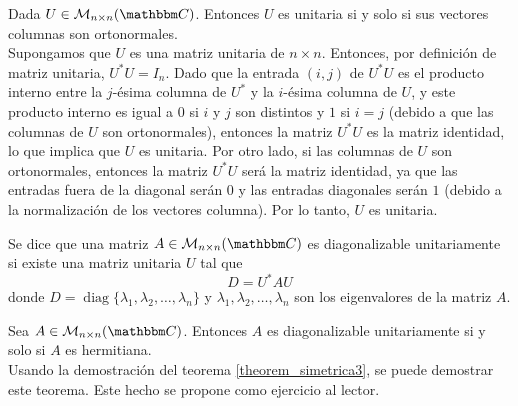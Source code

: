 \begin{theorem}\label{Uorto_vectoresorto}
    Dada $U \in \mathcal{M}_{n \times n}(\CC)$. Entonces $U$ es unitaria si y solo si sus vectores columnas son ortonormales. \\
    \demostracion Supongamos que $U$ es una matriz unitaria de $n \times n$. Entonces, por definición de matriz unitaria, $U^* U = I_n$. Dado que la entrada \( (i, j) \) de $U^*U$ es el producto interno entre la $j$-ésima columna de $U^*$ y la $i$-ésima columna de $U$, y este producto interno es igual a $0$ si $i$ y $j$ son distintos y $1$ si $i = j$ (debido a que las columnas de $U$ son ortonormales), entonces la matriz $U^* U$ es la matriz identidad, lo que implica que $U$ es unitaria. Por otro lado, si las columnas de $U$ son ortonormales, entonces la matriz $U^* U$ será la matriz identidad, ya que las entradas fuera de la diagonal serán $0$ y las entradas diagonales serán $1$ (debido a la normalización de los vectores columna). Por lo tanto, $U$ es unitaria.
\end{theorem}

\begin{definition}
    Se dice que una matriz $A \in \mathcal{M}_{n \times n}(\CC)$ es diagonalizable unitariamente si existe una matriz unitaria $U$ tal que
    $$D = U^*AU$$
    donde $D = \operatorname{diag} \{ \lambda_1, \lambda_2, \dots, \lambda_n \}$ y $\lambda_1, \lambda_2, \dots, \lambda_n$ son los eigenvalores de la matriz $A$.
\end{definition}

\newpage

\begin{theorem}\label{theorem_hermitiana3}
    Sea $A \in \mathcal{M}_{n \times n}(\CC)$. Entonces $A$ es diagonalizable unitariamente si y solo si $A$ es hermitiana. \\
    \demostracion Usando la demostración del teorema \ref{theorem_simetrica3}, se puede demostrar este teorema. Este hecho se propone como ejercicio al lector.
\end{theorem}

